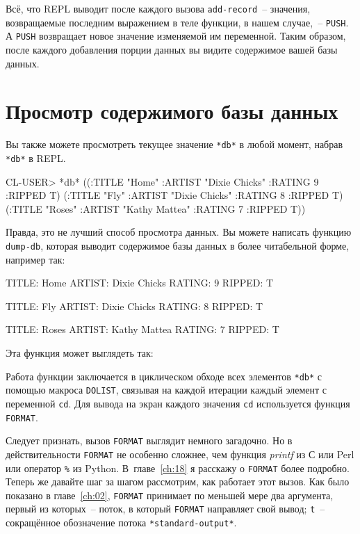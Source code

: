 Всё, что REPL выводит после каждого вызова \lstinline{add-record}~-- значения, возвращаемые
последним выражением в теле функции, в нашем случае,~-- \lstinline{PUSH}. А \lstinline{PUSH}
возвращает новое значение изменяемой им переменной. Таким образом, после каждого
добавления порции данных вы видите содержимое вашей базы данных.

\section{Просмотр содержимого базы данных}

Вы также можете просмотреть текущее значение \lstinline{*db*} в любой момент,
набрав \lstinline{*db*} в REPL.

\begin{myverb}
CL-USER> *db*
((:TITLE "Home" :ARTIST "Dixie Chicks" :RATING 9 :RIPPED T)
 (:TITLE "Fly" :ARTIST "Dixie Chicks" :RATING 8 :RIPPED T)
 (:TITLE "Roses" :ARTIST "Kathy Mattea" :RATING 7 :RIPPED T))
\end{myverb}

Правда, это не лучший способ просмотра данных. Вы можете написать функцию \lstinline{dump-db},
которая выводит содержимое базы данных в более читабельной форме, например так:

\begin{myverb}
   TITLE:    Home
   ARTIST:   Dixie Chicks
   RATING:   9
   RIPPED:   T
   
   TITLE:    Fly
   ARTIST:   Dixie Chicks
   RATING:   8
   RIPPED:   T
   
   TITLE:    Roses
   ARTIST:   Kathy Mattea
   RATING:   7
   RIPPED:   T
\end{myverb}

Эта функция может выглядеть так:


Работа функции заключается в циклическом обходе всех элементов \lstinline{*db*} с помощью макроса
\lstinline{DOLIST}, связывая на каждой итерации каждый элемент с переменной \lstinline{cd}. Для
вывода на экран каждого значения \lstinline{cd} используется функция \lstinline{FORMAT}.

Следует признать, вызов \lstinline{FORMAT} выглядит немного загадочно. Но в действительности
\lstinline{FORMAT} не особенно сложнее, чем функция \textit{printf} из С или
Perl или оператор \lstinline{%} из Python. В~главе~\ref{ch:18} я расскажу о
\lstinline{FORMAT} более подробно. Теперь же давайте шаг за шагом рассмотрим, как работает этот
вызов. Как было показано в главе~\ref{ch:02}, \lstinline{FORMAT} принимает по меньшей мере два аргумента,
первый из которых~-- поток, в который \lstinline{FORMAT} направляет свой вывод; \lstinline{t}~--
сокращённое обозначение потока \lstinline{*standard-output*}.

